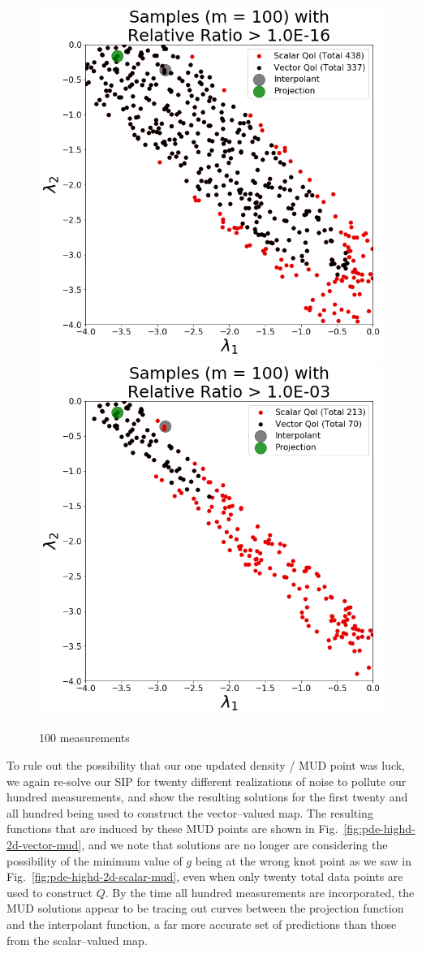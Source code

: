 \begin{figure}[htbp]
\centering
  \includegraphics[width=0.45\linewidth]{figures/pde-highd/pde-highd_update_scatter_D2_t1-0E-16.png}
  \includegraphics[width=0.45\linewidth]{figures/pde-highd/pde-highd_update_scatter_D2_t1-0E-03.png}
\caption{
100 measurements
}
\label{fig:pde-highd-2d-scatter}
\end{figure}

To rule out the possibility that our one updated density / MUD point was luck, we again re-solve our SIP for twenty different realizations of noise to pollute our hundred measurements, and show the resulting solutions for the first twenty and all hundred being used to construct the vector--valued map.
The resulting functions that are induced by these MUD points are shown in Fig.~\ref{fig:pde-highd-2d-vector-mud}, and we note that solutions are no longer are considering the possibility of the minimum value of $g$ being at the wrong knot point as we saw in Fig.~\ref{fig:pde-highd-2d-scalar-mud}, even when only twenty total data points are used to construct $Q$.
By the time all hundred measurements are incorporated, the MUD solutions appear to be tracing out curves between the projection function and the interpolant function, a far more accurate set of predictions than those from the scalar--valued map.

